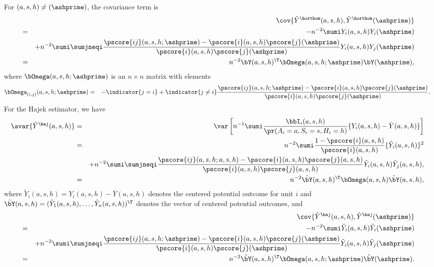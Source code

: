     For $(a,s,h) \neq (\ashprime)$, the covariance term is
    \begin{eqnarray*}
        && \cov\{\hat{Y}^{\horthom}(a,s,h), \hat{Y}^{\horthom}(\ashprime)\} \\
        &=& -n^{-2}\sumi  Y_i(a, s, h) Y_i(\ashprime) \\ &&+ n^{-2}\sumi\sumjneqi \frac{\pscore{ij}(a, s, h; \ashprime) - \pscore{i}(a, s, h)\pscore{j}(\ashprime)}{\pscore{i}(a, s, h)\pscore{j}(\ashprime)} Y_i(a, s, h) Y_j(\ashprime) \\
        &=& n^{-2} \bY(a,s,h)^{\T} \bOmega(a,s,h;\ashprime) \bY(\ashprime),
    \end{eqnarray*}
    where $\bOmega(a,s,h;\ashprime)$ is an $n\times n$ matrix with elements
    \begin{eqnarray*}
        \bOmega_{(i,j)}(a,s,h;\ashprime) &=& -\indicator\{j=i\}+ \indicator\{j\neq i\}\frac{\pscore{ij}(a, s, h; \ashprime) - \pscore{i}(a, s, h)\pscore{j}(\ashprime)}{\pscore{i}(a, s, h)\pscore{j}(\ashprime)}.
    \end{eqnarray*}
    For the Hajek estimator, we have
    \begin{eqnarray*}
        \avar\{\hat{Y}^{\haj}(a,s,h)\} &=& \var \left[ n^{-1}\sumi\frac{ \bbI_{i}(a,s,h) }{ \pr(A_{i}=a, S_{i}=s, H_{i}=h)}\{Y_{i}(a,s,h)-\bar Y(a,s,h)\}\right] \\
        &=& n^{-2}\sumi \frac{1 - \pscore{i}(a, s, h)}{\pscore{i}(a, s, h)}\{\tilde Y_i(a, s, h)\}^2 \\
        &&+ n^{-2}\sumi\sumjneqi\frac{\pscore{ij}(a, s, h; a, s, h) - \pscore{i}(a, s, h)\pscore{j}(a, s, h)}{\pscore{i}(a, s, h)\pscore{j}(a, s, h)}\tilde Y_i(a, s, h)\tilde Y_j(a, s, h), \\
        &=& n^{-2} \tilde\bY(a,s,h)^{\T} \bOmega(a,s,h)\tilde\bY(a,s,h),
    \end{eqnarray*}
    where $\tilde Y_i(a,s,h) = Y_i(a,s,h) - \bar Y(a,s,h)$ denotes the centered potential outcome for unit $i$ and $\tilde\bY(a,s,h)=(\tilde Y_1(a,s,h),\ldots,\tilde Y_n(a,s,h))^{\T}$ denotes the vector of centered potential outcomes, and
    \begin{eqnarray*}
        && \cov\{\hat{Y}^{\haj}(a,s,h), \hat{Y}^{\haj}(\ashprime)\} \\
        &=& -n^{-2}\sumi  \tilde Y_i(a, s, h) \tilde Y_i(\ashprime) \\ &&+ n^{-2}\sumi\sumjneqi \frac{\pscore{ij}(a, s, h; \ashprime) - \pscore{i}(a, s, h)\pscore{j}(\ashprime)}{\pscore{i}(a, s, h)\pscore{j}(\ashprime)} \tilde Y_i(a, s, h) \tilde Y_j(\ashprime) \\
        &=& n^{-2} \tilde\bY(a,s,h)^{\T} \bOmega(a,s,h;\ashprime)\tilde\bY(\ashprime).
    \end{eqnarray*}
    
